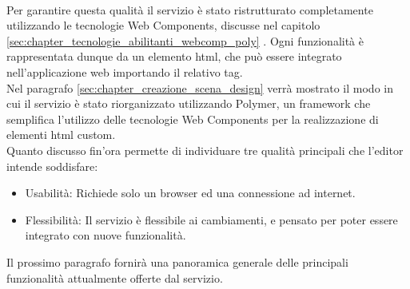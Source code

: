 \\ 
Per garantire questa qualità il servizio è stato ristrutturato completamente utilizzando le tecnologie Web Components, discusse nel capitolo \ref{sec:chapter_tecnologie_abilitanti_webcomp_poly} . Ogni funzionalità è rappresentata dunque da un elemento html, che può essere integrato nell’applicazione web importando il relativo tag.
\\
Nel paragrafo \ref{sec:chapter_creazione_scena_design} verrà mostrato il modo in cui il servizio è stato riorganizzato utilizzando Polymer, un framework che semplifica l’utilizzo delle tecnologie Web Components per la realizzazione di elementi html custom.
\\
Quanto discusso fin’ora permette di individuare tre qualità principali che l’editor intende soddisfare:
\begin{itemize}
\item Usabilità: Richiede solo un browser ed una connessione ad internet.
\item Flessibilità: Il servizio è flessibile ai cambiamenti, e pensato per poter essere integrato con nuove funzionalità.
\end{itemize}
Il prossimo paragrafo fornirà una panoramica generale delle principali funzionalità attualmente offerte dal servizio.